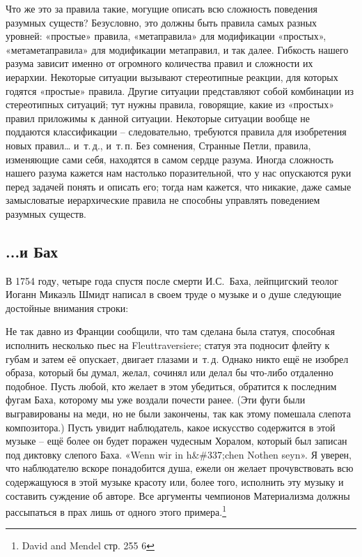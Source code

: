 \documentclass[../main.tex]{subfiles}
\begin{document}
Что же это за правила такие, могущие описать всю сложность поведения разумных существ? Безусловно, это должны быть правила самых разных уровней: «простые» правила, «метаправила» для модификации «простых», «метаметаправила» для модификации метаправил, и так далее. Гибкость нашего разума зависит именно от огромного количества правил и сложности их иерархии. Некоторые ситуации вызывают стереотипные реакции, для которых годятся «простые» правила. Другие ситуации представляют собой комбинации из стереотипных ситуаций; тут нужны правила, говорящие, какие из «простых» правил приложимы к данной ситуации. Некоторые ситуации вообще не поддаются классификации \--- следовательно, требуются правила для изобретения новых правил\ldots{} и~т.\,д., и~т.\,п. Без сомнения, Странные Петли, правила, изменяющие сами себя, находятся в самом сердце разума. Иногда сложность нашего разума кажется нам настолько поразительной, что у нас опускаются руки перед задачей понять и описать его; тогда нам кажется, что никакие, даже самые замысловатые иерархические правила не способны управлять поведением разумных существ.


\subsection{...и Бах}

В 1754 году, четыре года спустя после смерти И.С.~Баха, лейпцигский теолог Иоганн Микаэль Шмидт написал в своем труде о музыке и о душе следующие достойные внимания строки:

Не так давно из Франции сообщили, что там сделана была статуя, способная исполнить несколько пьес на Fleuttraversiere; статуя эта подносит флейту к губам и затем её опускает, двигает глазами и~т.\,д. Однако никто ещё не изобрел образа, который бы думал, желал, сочинял или делал бы что-либо отдаленно подобное. Пусть любой, кто желает в этом убедиться, обратится к последним фугам Баха, которому мы уже воздали почести ранее. (Эти фуги были выгравированы на меди, но не были закончены, так как этому помешала слепота композитора.) Пусть увидит наблюдатель, какое искусство содержится в этой музыке \--- ещё более он будет поражен чудесным Хоралом, который был записан под диктовку слепого Баха. «Wenn wir in h\&\#337;chen Nothen seyn». Я уверен, что наблюдателю вскоре понадобится душа, ежели он желает прочувствовать всю содержащуюся в этой музыке красоту или, более того, исполнить эту музыку и составить суждение об авторе. Все аргументы чемпионов Материализма должны рассыпаться в прах лишь от одного этого примера.\footnote{David and Mendel стр. 255 6}
\end{document}
